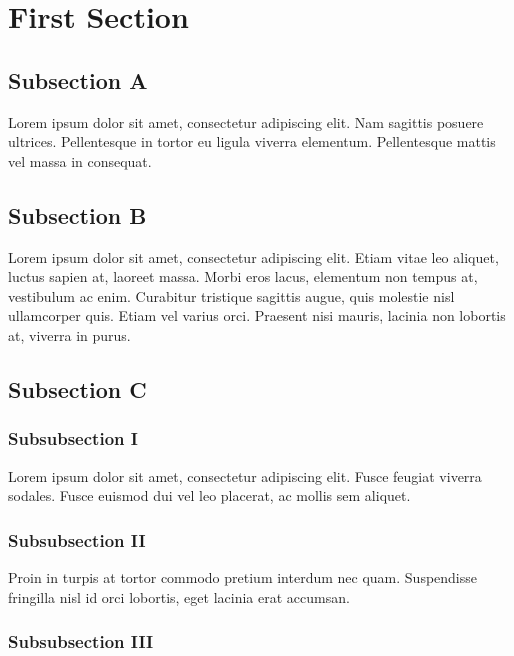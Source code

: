 \par\section{First Section}
\par\subsection{Subsection A}
\par\noindent Lorem ipsum dolor sit amet, consectetur adipiscing elit. Nam sagittis posuere ultrices. Pellentesque in tortor eu ligula viverra elementum. Pellentesque mattis vel massa in consequat. 
\par\subsection{Subsection B}
\par\noindent Lorem ipsum dolor sit amet, consectetur adipiscing elit. Etiam vitae leo aliquet, luctus sapien at, laoreet massa. Morbi eros lacus, elementum non tempus at, vestibulum ac enim. Curabitur tristique sagittis augue, quis molestie nisl ullamcorper quis. Etiam vel varius orci. Praesent nisi mauris, lacinia non lobortis at, viverra in purus.
\par\subsection{Subsection C}
\par\subsubsection{Subsubsection I}
\par\noindent Lorem ipsum dolor sit amet, consectetur adipiscing elit. Fusce feugiat viverra sodales. Fusce euismod dui vel leo placerat, ac mollis sem aliquet. 
\par\subsubsection{Subsubsection II}
\par\noindent Proin in turpis at tortor commodo pretium interdum nec quam. Suspendisse fringilla nisl id orci lobortis, eget lacinia erat accumsan. 
\par\subsubsection{Subsubsection III}
